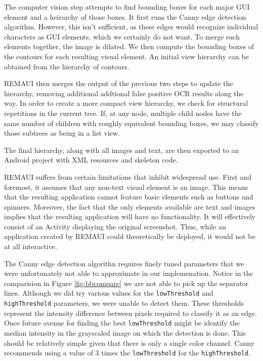 \documentclass[12pt,twocolumn]{article}
\begin{document}
The computer vision step attempts to find bounding boxes for each major GUI
element and a heirarchy of those boxes.  It first runs the Canny edge detection
algorithm.  However, this isn't sufficient, as these edges would recognize
individual characters as GUI elements, which we certainly do not want.  To merge
such elements together, the image is dilated.  We then compute the bounding
boxes of the contours for each resulting visual element.  An initial view
hierarchy can be obtained from the hierarchy of contours.

REMAUI then merges the output of the previous two steps to update the hierarchy,
removing additional addtional false positive OCR results along the way.  In
order to create a more compact view hierarchy, we check for structural
repetitions in the current tree.  If, at any node, multiple child nodes have the
same number of children with roughly equivalent bounding boxes, we may classify
those subtrees as being in a list view.

The final hierarchy, along with all images and text, are then exported to an
Android project with XML resources and skeleton code.

REMAUI suffers from certain limitations that inhibit widespread use.  First and
foremost, it assumes that any non-text visual element is an image.  This means
that the resulting application cannot feature basic elements such as buttons and
spinners.  Moreover, the fact that the only elements available are text and
images implies that the resulting application will have no functionality.  It
will effectively consist of an Activity displaying the original screenshot.
Thus, while an application created by REMAUI could theoretically be deployed, it
would not be at all interactive.

The Canny edge detection algorithn requires finely tuned parameters that we were
unfortunately not able to approximate in our implemenation.  Notice in the
comparision in Figure \ref{fig:bbcompare} we are not able to pick up the
separator lines.  Although we did try various values for the \verb`lowThreshold`
and \verb`highThreshold` parameters, we were unable to detect them.  These
thresholds represent the intensity difference between pixels required to
classify it as an edge.  Once future avenue for finding the best
\verb`lowThreshold` might be identify the median intensity in the grayscaled
image on which the detection is done.  This should be relatively simple given
that there is only a single color channel.  Canny recommends using a value of 3
times the \verb`lowThreshold` for the \verb`highThreshold`.
\end{document}
